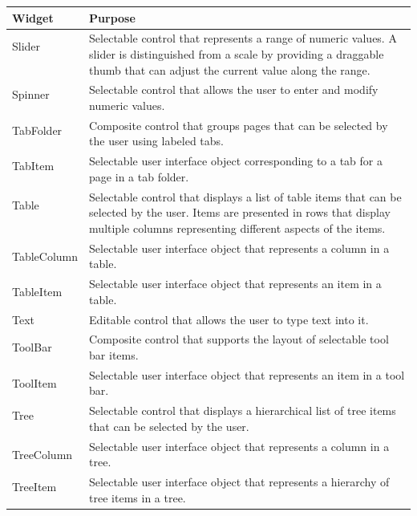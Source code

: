 \begin{center}
\begin{tabular}{l|l}
Widget & Purpose\\
\hline
Slider & \multirow{3}{*}{\parbox{12cm}{Selectable control that represents a range of numeric values. A slider is distinguished from a scale by providing a draggable thumb that can adjust the current value along the range.}}\\
&\\
&\\
Spinner & \multirow{2}{*}{\parbox{12cm}{Selectable control that allows the user to enter and modify numeric values.}}\\
&\\
TabFolder & \multirow{2}{*}{\parbox{12cm}{Composite control that groups pages that can be selected by the user using labeled tabs.}}\\
&\\
TabItem & \multirow{2}{*}{\parbox{12cm}{Selectable user interface object corresponding to a tab for a page in a tab folder.}}\\
&\\
Table & \multirow{3}{*}{\parbox{12cm}{Selectable control that displays a list of table items that can be selected by the user. Items are presented in rows that display multiple columns representing different aspects of the items.}}\\
&\\
&\\
TableColumn & Selectable user interface object that represents a column in a table.\\
TableItem & Selectable user interface object that represents an item in a table.\\
Text & Editable control that allows the user to type text into it.\\
ToolBar & Composite control that supports the layout of selectable tool bar items.\\
ToolItem & Selectable user interface object that represents an item in a tool bar.\\
Tree & \multirow{2}{*}{\parbox{12cm}{Selectable control that displays a hierarchical list of tree items that can be selected by the user.}}\\
&\\
TreeColumn & Selectable user interface object that represents a column in a tree.\\
TreeItem & \multirow{2}{*}{\parbox{12cm}{Selectable user interface object that represents a hierarchy of tree items in a tree.}}\\
&\\
\end{tabular}
\end{center}

